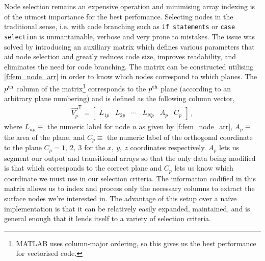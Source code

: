 		Node selection remains an expensive operation and minimising array indexing is of the utmost importance for the best perfomance. Selecting nodes in the traditional sense, i.e. with code branching such as \texttt{if statements} or \texttt{case selection} is unmantainable, verbose and very prone to mistakes. The issue was solved by introducing an auxiliary matrix which defines various parameters that aid node selection and greatly reduces code size, improves readability, and eliminates the need for code branching. The matrix can be constructed utilising \cref{f:fem_node_arr} in order to know which nodes correspond to which  planes. The $ p\textsuperscript{th} $ column of the matrix\footnote{MATLAB uses column-major ordering, so this gives us the best performance for vectorised code.} corresponds to the $ p\textsuperscript{th} $ plane (according to an arbitrary plane numbering) and is defined as the following column vector,
		\begin{align}
			\vec{V_{p}}^{\mathsf{T}} =
				\begin{bmatrix}
					L_{1p} & L_{2p} & \cdots & L_{Np} & A_{p} & C_{p}
				\end{bmatrix}\,,
		\end{align}	
		where $ L_{np} \equiv $ the numeric label for node $ n $ as given by \cref{f:fem_node_arr}, $ A_{p} \equiv $ the area of the plane, and $ C_{p} \equiv$ the numeric label of the orthogonal coordinate to the plane $ C_{p} = 1, ~2, ~3 $ for the $ x, ~y, ~z $ coordinates respectively. $ A_{p} $ lets us segment our output and transitional arrays so that the only data being modified is that which corresponds to the correct plane and $ C_{p} $ lets us know which coordinate we must use in our selection criteria. The information codified in this matrix allows us to index and process only the necessary columns to extract the surface nodes we're interested in. The advantage of this setup over a naïve implementation is that it can be relatively easily expanded, maintained, and is general enough that it lends itself to a variety of selection criteria.
